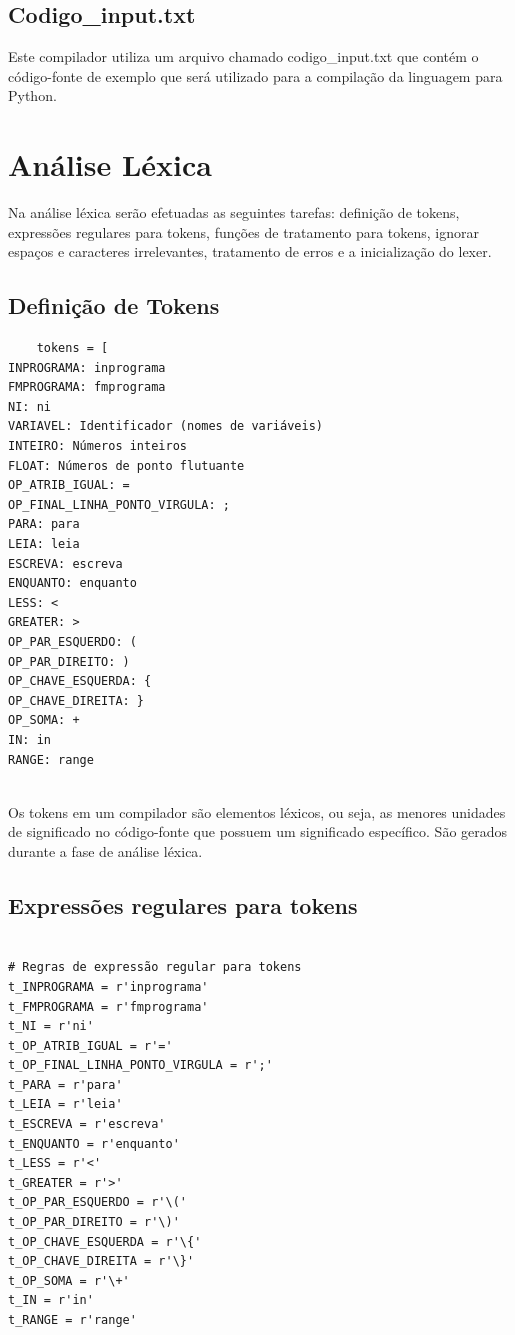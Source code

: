 \documentclass[a4paper,12pt]{article}
\begin{document}
\subsection{Codigo\_input.txt}
Este compilador utiliza um arquivo chamado codigo\_input.txt que contém 
o código-fonte de exemplo que será utilizado para a compilação da 
linguagem para Python.

\section{Análise Léxica}
Na análise léxica serão efetuadas as seguintes tarefas: definição de 
tokens, expressões regulares para tokens, funções de tratamento para 
tokens, ignorar espaços e caracteres irrelevantes, tratamento de erros e 
a inicialização do lexer.


\subsection{Definição de Tokens}

\begin{BVerbatim}
    tokens = [
INPROGRAMA: inprograma
FMPROGRAMA: fmprograma
NI: ni
VARIAVEL: Identificador (nomes de variáveis)
INTEIRO: Números inteiros
FLOAT: Números de ponto flutuante
OP_ATRIB_IGUAL: =
OP_FINAL_LINHA_PONTO_VIRGULA: ;
PARA: para
LEIA: leia
ESCREVA: escreva
ENQUANTO: enquanto
LESS: <
GREATER: >
OP_PAR_ESQUERDO: (
OP_PAR_DIREITO: )
OP_CHAVE_ESQUERDA: {
OP_CHAVE_DIREITA: }
OP_SOMA: +
IN: in
RANGE: range
\end{BVerbatim}
\\


Os tokens em um compilador são elementos léxicos, ou seja, as menores 
unidades de significado no código-fonte que possuem um significado 
específico. São gerados durante a fase de análise léxica.


\subsection{Expressões regulares para tokens}

\begin{Verbatim}

# Regras de expressão regular para tokens
t_INPROGRAMA = r'inprograma'
t_FMPROGRAMA = r'fmprograma'
t_NI = r'ni'
t_OP_ATRIB_IGUAL = r'='
t_OP_FINAL_LINHA_PONTO_VIRGULA = r';'
t_PARA = r'para'
t_LEIA = r'leia'
t_ESCREVA = r'escreva'
t_ENQUANTO = r'enquanto'
t_LESS = r'<'
t_GREATER = r'>'
t_OP_PAR_ESQUERDO = r'\('
t_OP_PAR_DIREITO = r'\)'
t_OP_CHAVE_ESQUERDA = r'\{'
t_OP_CHAVE_DIREITA = r'\}'
t_OP_SOMA = r'\+'
t_IN = r'in'
t_RANGE = r'range'
\end{Verbatim}
\end{document}
